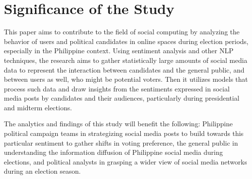 \section{Significance of the Study}
This paper aims to contribute to the field of social computing by analyzing the behavior of users and political candidates in online spaces during election periods, especially in the Philippine context. Using sentiment analysis and other NLP techniques, the research aims to gather statistically large amounts of social media data to represent the interaction between candidates and the general public, and between users as well, who might be potential voters. Then it utilizes models that process such data and draw insights from the sentiments expressed in social media posts by candidates and their audiences, particularly during presidential and midterm elections.

The analytics and findings of this study will benefit the following: Philippine political campaign teams in strategizing social media posts to build towards this particular sentiment to gather shifts in voting preference, the general public in understanding the information diffusion of Philippine social media during elections, and political analysts in grasping a wider view of social media networks during an election season.